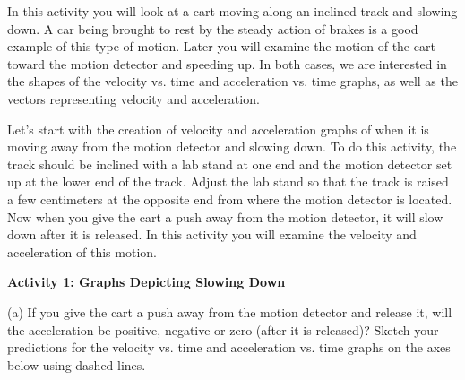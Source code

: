 In this activity you will look at a cart moving along an inclined track and
slowing down. A car being brought to rest by the steady action of brakes is
a good example of this type of motion. Later you will examine the motion of
the cart toward the motion detector and speeding up. In both cases, we are interested
in the shapes of the velocity vs. time and acceleration vs. time graphs, as
well as the vectors representing velocity and acceleration. 

Let's start with the creation of velocity and acceleration graphs of when it
is moving away from the motion detector and slowing down. To do this activity,
the track should be inclined with a lab stand at one end and the motion detector set up at the lower end of the track. Adjust the lab stand so that the track is raised a few centimeters at the opposite end from where the motion detector is located. Now when you give the cart a push away from the motion detector, it will slow down after it is released. In this activity you will examine the velocity and acceleration of this motion.

\textbf{Activity 1: Graphs Depicting Slowing Down} 

(a) If you give the cart a push away from the motion detector and release it,
will the acceleration be positive, negative or zero (after it is released)?
Sketch your predictions for the velocity vs. time and acceleration vs. time
graphs on the axes below using dashed lines.


